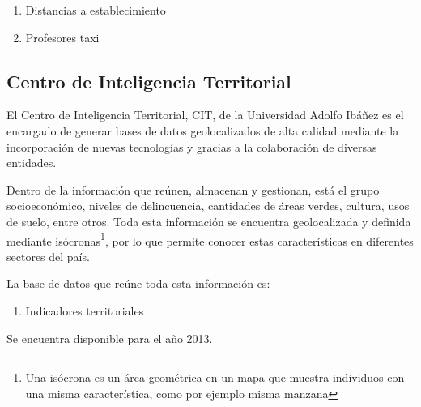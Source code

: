 \begin{enumerate}
\item Distancias a establecimiento
\item Profesores taxi
\end{enumerate}

\subsection{Centro de Inteligencia Territorial}
El Centro de Inteligencia Territorial, CIT, de la Universidad Adolfo Ibáñez es el encargado de generar bases de datos geolocalizados de alta calidad mediante la incorporación de nuevas tecnologías y gracias a la colaboración de diversas entidades. 

Dentro de la información que reúnen, almacenan y gestionan, está el grupo socioeconómico, niveles de delincuencia, cantidades de áreas verdes, cultura, usos de suelo, entre otros. Toda esta información se encuentra geolocalizada y definida mediante isócronas\footnote{Una isócrona es un área geométrica en un mapa que muestra individuos con una misma característica, como por ejemplo misma manzana}, por lo que permite conocer estas características en diferentes sectores del país.

La base de datos que reúne toda esta información es:
\begin{enumerate}
\item Indicadores territoriales
\end{enumerate}

Se encuentra disponible para el año 2013. 


